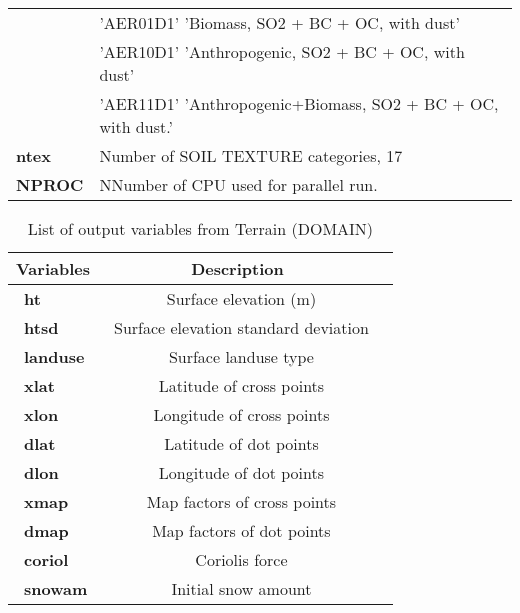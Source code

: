 \begin{table}[h]
\begin{center}
\begin{tabular}{|l|l|}
&  \vspace{-0.15 cm} \hspace{0.5 cm} {\footnotesize 'AER01D1'}  \hspace{0.5 cm} {\footnotesize 'Biomass, SO2 + BC + OC, with dust'}\\
&  \vspace{-0.15 cm} \hspace{0.5 cm} {\footnotesize 'AER10D1'}  \hspace{0.5 cm} {\footnotesize 'Anthropogenic, SO2 + BC + OC, with dust'}\\
&  \vspace{-0.15 cm} \hspace{0.5 cm} {\footnotesize 'AER11D1'}  \hspace{0.5 cm} {\footnotesize 'Anthropogenic+Biomass, SO2 + BC + OC, with dust.'}\\
\hline
{\footnotesize {\bf ntex}}   & {\footnotesize Number of SOIL TEXTURE categories, 17} \\ \hline
{\footnotesize {\bf NPROC}}   & {\footnotesize NNumber of CPU used for parallel run.} \\ \hline
\hline
\end{tabular}
\end{center}
\end{table}

\begin{table}[h]
\begin{center}
\caption{List of output variables from Terrain (DOMAIN)}  \label{ter_var}
\vspace{0.25cm}
\begin{tabular}{|l|c|l|} \hline \hline
{\small {\bf Variables}} & {\small {\bf Description}} \\ \hline \hline
{\ {\bf ht}}    & {\ {Surface elevation (m)} }      \\ \hline
{\ {\bf htsd}}    & {\ {Surface elevation standard deviation} }    \\ \hline
{\ {\bf landuse}}    & {\ {Surface landuse type}}       \\ \hline
{\ {\bf xlat}}    & {\ {Latitude of cross points} }      \\ \hline
{\ {\bf xlon}}    & {\ {Longitude of cross points}}   \\ \hline
{\ {\bf dlat}}    & {\ {Latitude of dot points}}       \\ \hline
{\ {\bf dlon}}    & {\ {Longitude of dot points} }      \\ \hline
{\ {\bf xmap}}    & {\ {Map factors of cross points} }     \\ \hline
{\ {\bf dmap}}    & {\ {Map factors of dot points}}       \\ \hline
{\ {\bf coriol}}    & {\ {Coriolis force} }      \\ \hline
{\ {\bf snowam}}    & {\ {Initial snow amount} }     \\ \hline
\end{tabular}
\end{center}
\end{table}
